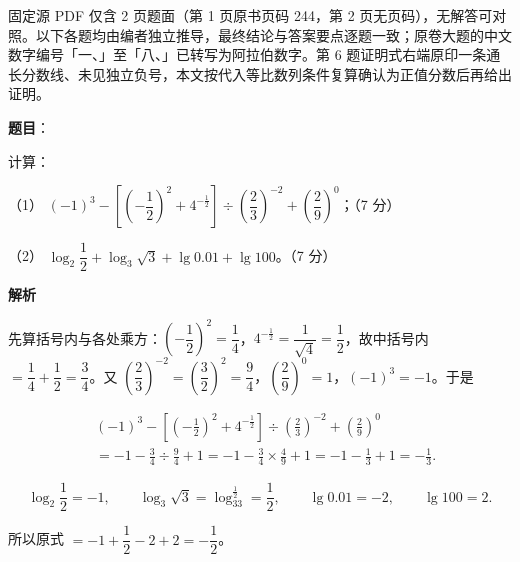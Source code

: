 

\begin{gktip}
固定源 PDF 仅含 2 页题面（第 1 页原书页码 244，第 2 页无页码），无解答可对照。以下各题均由编者独立推导，最终结论与答案要点逐题一致；原卷大题的中文数字编号「一、」至「八、」已转写为阿拉伯数字。第 6 题证明式右端原印一条通长分数线、未见独立负号，本文按代入等比数列条件复算确认为正值分数后再给出证明。
\end{gktip}

\begin{answer}

\textbf{题目}：

计算：

（1） $(-1)^3-\left[\left(-\dfrac12\right)^2+4^{-\frac12}\right]\div\left(\dfrac23\right)^{-2}+\left(\dfrac29\right)^0$；（7 分）

（2） $\log_2\dfrac12+\log_3\sqrt3+\lg0.01+\lg100$。（7 分）

\textbf{解析}


先算括号内与各处乘方：$\left(-\dfrac12\right)^2=\dfrac14$，$4^{-\frac12}=\dfrac1{\sqrt4}=\dfrac12$，故中括号内 $=\dfrac14+\dfrac12=\dfrac34$。又 $\left(\dfrac23\right)^{-2}=\left(\dfrac32\right)^2=\dfrac94$，$\left(\dfrac29\right)^0=1$，$(-1)^3=-1$。于是

\nopagebreak[4]
\[
\begin{aligned}
&(-1)^3-\left[\left(-\frac12\right)^2+4^{-\frac12}\right]\div\left(\frac23\right)^{-2}+\left(\frac29\right)^0\\
&=-1-\frac34\div\frac94+1=-1-\frac34\times\frac49+1=-1-\frac13+1=-\frac13.
\end{aligned}
\]


\nopagebreak[4]
\[
\log_2\frac12=-1,\qquad \log_3\sqrt3=\log_33^{\frac12}=\frac12,\qquad \lg0.01=-2,\qquad \lg100=2.
\]

所以原式 $=-1+\dfrac12-2+2=-\dfrac12$。



\end{answer}
